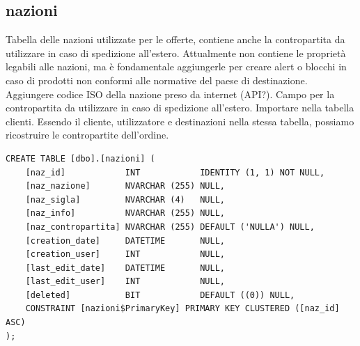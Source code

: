 \documentclass[12pt]{article}
\begin{document}
\subsection{nazioni}
Tabella delle nazioni utilizzate per le offerte, contiene anche la contropartita da utilizzare in caso di spedizione all'estero.
Attualmente non contiene le proprietà legabili alle nazioni, ma è fondamentale aggiungerle per creare alert o blocchi in caso di prodotti
non conformi alle normative del paese di destinazione.
Aggiungere codice ISO della nazione preso da internet (API?).
Campo per la contropartita da utilizzare in caso di spedizione all'estero.
Importare nella tabella clienti.
Essendo il cliente, utilizzatore e destinazioni nella stessa tabella, possiamo ricostruire le contropartite dell'ordine.
\begin{lstlisting}
CREATE TABLE [dbo].[nazioni] (
    [naz_id]            INT            IDENTITY (1, 1) NOT NULL,
    [naz_nazione]       NVARCHAR (255) NULL,
    [naz_sigla]         NVARCHAR (4)   NULL,
    [naz_info]          NVARCHAR (255) NULL,
    [naz_contropartita] NVARCHAR (255) DEFAULT ('NULLA') NULL,
    [creation_date]     DATETIME       NULL,
    [creation_user]     INT            NULL,
    [last_edit_date]    DATETIME       NULL,
    [last_edit_user]    INT            NULL,
    [deleted]           BIT            DEFAULT ((0)) NULL,
    CONSTRAINT [nazioni$PrimaryKey] PRIMARY KEY CLUSTERED ([naz_id] ASC)
);
\end{lstlisting}
\end{document}
